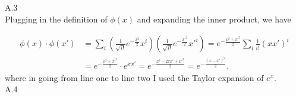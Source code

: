 \documentclass{article}
\begin{document}
A.3 \\
Plugging in the definition of $\phi(x)$ and expanding the inner product, we have

\begin{align*}
        \phi(x) \cdot \phi(x') 
        &= \sum_i \left( \frac{1}{\sqrt{i!}} e^{-\frac{x^2}{2}} x^i \right)
        \left( \frac{1}{\sqrt{i!}} e^{-\frac{x'^2}{2}} x'^i \right)
        = e^{-\frac{x^2 + x'^2}{2}} \sum_i \frac{1}{i!} (x x')^i \\
        &= e^{-\frac{x^2 + x'^2}{2}} \cdot e^{xx'}
        = e^{-\frac{x^2 - 2xx' + x'^2}{2}}
        = e^{-\frac{(x-x')^2}{2}},
\end{align*}
where in going from line one to line two I used the Taylor expansion of $e^x$. \\


\newpage
A.4
\end{document}
